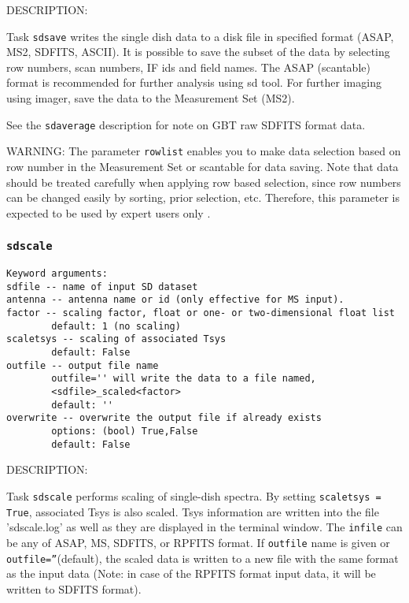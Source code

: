           DESCRIPTION:

          Task {\tt sdsave} writes the single dish data to a disk file in 
          specified format (ASAP, MS2, SDFITS, ASCII). It is possible to
          save the subset of the data by selecting row numbers, scan numbers, IF ids
          and field names. The ASAP (scantable) format is recommended for
          further analysis using sd tool. For further imaging using imager,
          save the data to the Measurement Set (MS2).
          
          See the {\tt sdaverage} description for note on GBT raw SDFITS format data.

          WARNING:  The parameter {\tt rowlist} enables you to make data selection based
          on row number in the Measurement Set or scantable for data saving. 
          Note that data should be treated carefully when applying row
          based selection, since row numbers can be changed easily by
          sorting, prior selection, etc. Therefore, this parameter is expected
          to be used by expert users only . 


\subsubsection{{\tt sdscale}}
\label{section:sd.sdtasks.tasks.sdscale}

\begin{verbatim}
Keyword arguments:
sdfile -- name of input SD dataset
antenna -- antenna name or id (only effective for MS input).
factor -- scaling factor, float or one- or two-dimensional float list
        default: 1 (no scaling)
scaletsys -- scaling of associated Tsys
        default: False
outfile -- output file name
        outfile='' will write the data to a file named,
        <sdfile>_scaled<factor>
        default: ''
overwrite -- overwrite the output file if already exists
        options: (bool) True,False
        default: False
\end{verbatim}

    DESCRIPTION:

    Task {\tt sdscale} performs scaling of single-dish spectra.
    By setting {\tt scaletsys = True}, associated Tsys is also scaled.
    Tsys information are written into the file 'sdscale.log'
    as well as they are displayed in the terminal window.
    The {\tt infile} can be any of ASAP, MS, SDFITS, or RPFITS format.
    If {\tt outfile} name is given or {\tt outfile=''}(default), the scaled data is written
    to a new file with the same format as the input data (Note: in case of the
    RPFITS format input data, it will be written to SDFITS format).
    
